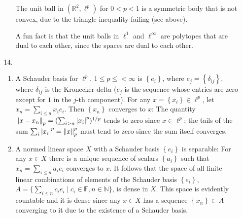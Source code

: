 \documentclass[11pt,leqno]{article}
\theoremstyle{plain}
\theoremstyle{definition}
\numberwithin{equation}{section}
\numberwithin{lem}{section}
\newcommand{\cbr}[1]{\left\{#1\right\}}
\begin{document}
\begin{enumerate}
\begin{enumerate}
    The unit ball in $(\mathbb R^2,\ell^p)$ for $0<p<1$ is a symmetric body that is not convex, due to the triangle inequality failing (see above).

    A fun fact is that the unit balls in $\ell^1$ and $\ell^\infty$ are polytopes that are dual to each other, since the spaces are dual to each other.
  \end{enumerate}\newpage
  
  \item[14.]
  \begin{enumerate}
      \item A Schauder basis for $\ell^p$, $1\leq p\leq <\infty$ is $\cbr{e_i}$, where $e_j = \cbr{\delta_{ij}}$, where $\delta_{ij}$ is the Kronecker delta ($e_j$ is the sequence whose entries are zero except for $1$ in the $j$-th component). For any $x = \cbr{x_i}\in \ell^p$, let $x_n = \sum_{i\leq n} x_ie_i$. Then $\cbr{x_n}$ converges to $x$: The quantity $\norm{x-x_n}_p = (\sum_{i>n}\abs{x_i}^p)^{1/p}$ tends to zero since $x\in \ell^p$; the tails of the sum $\sum_i\abs{x_i}^p = \norm{x}_p^p$ must tend to zero since the sum itself converges.

      \item A normed linear space $X$ with a Schauder basis $\cbr{e_i}$ is separable: For any $x \in X$ there is a unique sequence of scalars $\cbr{a_i}$ such that $x_n = \sum_{i\leq n} a_ie_i$ converges to $x$. It follows that the space of all finite linear combinations of elements of the Schauder basis $\cbr{e_i}$, $A = \{\sum_{i\leq n}c_ie_i\mid c_i\in \mathbb F, n\in \mathbb N\}$, is dense in $X$. This space is evidently countable and it is dense since any $x\in X$ has a sequence $\cbr{x_n} \subset A$ converging to it due to the existence of a Schauder basis.
  \end{enumerate}
\end{enumerate}
\end{document}
